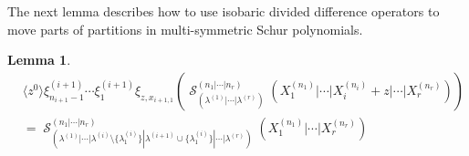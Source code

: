 \documentclass[12pt,reqno]{amsart}
\theoremstyle{definition}
\newtheorem{lem}[thm]{Lemma}
\DeclareMathOperator{\cS}{\mathcal{S}}
\begin{document}
The next lemma describes how to use isobaric divided difference operators to move parts of partitions in multi-symmetric Schur polynomials. 

\begin{lem}
\begin{align*}
    &\langle z^0 \rangle\xi^{(i+1)}_{n_{i+1}-1}\cdots \xi^{(i+1)}_{1} \xi_{z,x_{i+1,1}}\left( \cS_{(\lambda^{(1)}|\cdots |\lambda^{(r)})}^{(n_1|\cdots|n_r)} (X_1^{(n_1)}|\cdots| X_{i}^{(n_i)}+z|\cdots |X_r^{(n_r)}) \right)\\
    &= \cS_{(\lambda^{(1)}|\cdots|\lambda^{(i)}\setminus \{\lambda^{(i)}_{1}\}|\lambda^{(i+1)} \cup \{\lambda^{(i)}_{1}\}|\cdots |\lambda^{(r)})}^{(n_1|\cdots|n_r)} (X_1^{(n_1)}|\cdots|X_r^{(n_r)})\\
\end{align*}
   
\end{lem}
\end{document}
